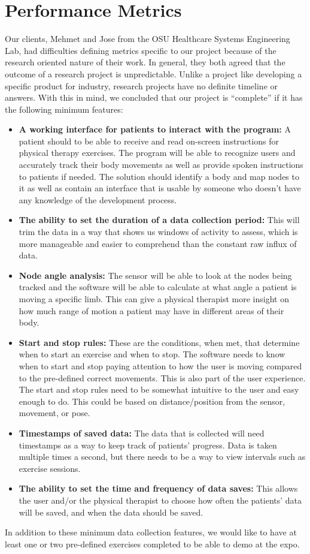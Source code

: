 \documentclass[onecolumn, draftclsnofoot,10pt, compsoc]{IEEEtran}
\begin{document}
\section{Performance Metrics}
Our clients, Mehmet and Jose from the OSU Healthcare Systems Engineering Lab, had difficulties defining metrics specific to our project because of the research oriented nature of their work. In general, they both agreed that the outcome of a research project is unpredictable. Unlike a project like developing a specific product for industry, research projects have no definite timeline or answers. With this in mind, we concluded that our project is “complete” if it has the following minimum features:
\begin{itemize}
    \item \textbf{A working interface for patients to interact with the program:} A patient should to be able to receive and read on-screen instructions for physical therapy exercises. The program will be able to recognize users and accurately track their body movements as well as provide spoken instructions to patients if needed. The solution should identify a body and map nodes to it as well as contain an interface that is usable by someone who doesn't have any knowledge of the development process.
    \item \textbf{The ability to set the duration of a data collection period:} This will trim the data in a way that shows us windows of activity to assess, which is more manageable and easier to comprehend than the constant raw influx of data.
    \item \textbf{Node angle analysis:} The sensor will be able to look at the nodes being tracked and the software will be able to calculate at what angle a patient is moving a specific limb. This can give a physical therapist more insight on how much range of motion a patient may have in different areas of their body. 
    \item \textbf{Start and stop rules:} These are the conditions, when met, that determine when to start an exercise and when to stop. The software needs to know when to start and stop paying attention to how the user is moving compared to the pre-defined correct movements. This is also part of the user experience. The start and stop rules need to be somewhat intuitive to the user and easy enough to do. This could be based on distance/position from the sensor, movement, or pose.
    \item \textbf{Timestamps of saved data:} The data that is collected will need timestamps as a way to keep track of patients' progress. Data is taken multiple times a second, but there needs to be a way to view intervals such as exercise sessions.
    \item \textbf{The ability to set the time and frequency of data saves:} This allows the user and/or the physical therapist to choose how often the patients' data will be saved, and when the data should be saved.
\end{itemize}
In addition to these minimum data collection features, we would like to have at least one or two pre-defined exercises completed to be able to demo at the expo.
\end{document}
